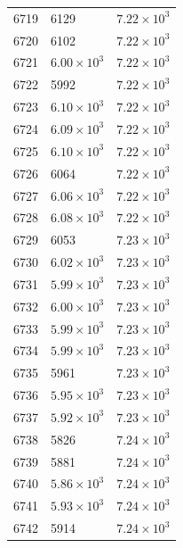 \begin{table}[H]
\begin{tabular}{lll}
6719 & 6129 & $\displaystyle 7.22 \times 10^{3}$ \\
6720 & 6102 & $\displaystyle 7.22 \times 10^{3}$ \\
6721 & $\displaystyle 6.00 \times 10^{3}$ & $\displaystyle 7.22 \times 10^{3}$ \\
6722 & 5992 & $\displaystyle 7.22 \times 10^{3}$ \\
6723 & $\displaystyle 6.10 \times 10^{3}$ & $\displaystyle 7.22 \times 10^{3}$ \\
6724 & $\displaystyle 6.09 \times 10^{3}$ & $\displaystyle 7.22 \times 10^{3}$ \\
6725 & $\displaystyle 6.10 \times 10^{3}$ & $\displaystyle 7.22 \times 10^{3}$ \\
6726 & 6064 & $\displaystyle 7.22 \times 10^{3}$ \\
6727 & $\displaystyle 6.06 \times 10^{3}$ & $\displaystyle 7.22 \times 10^{3}$ \\
6728 & $\displaystyle 6.08 \times 10^{3}$ & $\displaystyle 7.22 \times 10^{3}$ \\
6729 & 6053 & $\displaystyle 7.23 \times 10^{3}$ \\
6730 & $\displaystyle 6.02 \times 10^{3}$ & $\displaystyle 7.23 \times 10^{3}$ \\
6731 & $\displaystyle 5.99 \times 10^{3}$ & $\displaystyle 7.23 \times 10^{3}$ \\
6732 & $\displaystyle 6.00 \times 10^{3}$ & $\displaystyle 7.23 \times 10^{3}$ \\
6733 & $\displaystyle 5.99 \times 10^{3}$ & $\displaystyle 7.23 \times 10^{3}$ \\
6734 & $\displaystyle 5.99 \times 10^{3}$ & $\displaystyle 7.23 \times 10^{3}$ \\
6735 & 5961 & $\displaystyle 7.23 \times 10^{3}$ \\
6736 & $\displaystyle 5.95 \times 10^{3}$ & $\displaystyle 7.23 \times 10^{3}$ \\
6737 & $\displaystyle 5.92 \times 10^{3}$ & $\displaystyle 7.23 \times 10^{3}$ \\
6738 & 5826 & $\displaystyle 7.24 \times 10^{3}$ \\
6739 & 5881 & $\displaystyle 7.24 \times 10^{3}$ \\
6740 & $\displaystyle 5.86 \times 10^{3}$ & $\displaystyle 7.24 \times 10^{3}$ \\
6741 & $\displaystyle 5.93 \times 10^{3}$ & $\displaystyle 7.24 \times 10^{3}$ \\
6742 & 5914 & $\displaystyle 7.24 \times 10^{3}$ \\

\end{tabular}
\end{table}
